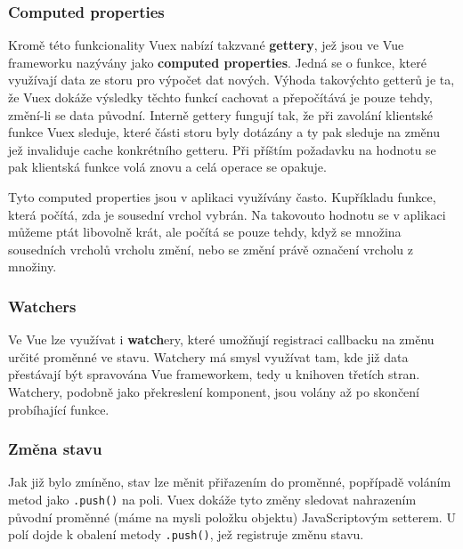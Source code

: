 \subsubsection{Computed properties}

Kromě této funkcionality Vuex nabízí takzvané \textbf{gettery}, jež jsou ve Vue frameworku nazývány jako \textbf{computed properties}. Jedná se o funkce, které využívají data ze storu pro výpočet dat nových. Výhoda takovýchto getterů je ta, že Vuex dokáže výsledky těchto funkcí cachovat a přepočítává je pouze tehdy, změní-li se data původní. Interně gettery fungují tak, že při zavolání klientské funkce Vuex sleduje, které části storu byly dotázány a ty pak sleduje na změnu jež invaliduje cache konkrétního getteru. Při příštím požadavku na hodnotu se pak klientská funkce volá znovu a celá operace se opakuje.

Tyto computed properties jsou v aplikaci využívány často. Kupříkladu funkce, která počítá, zda je sousední vrchol vybrán. Na takovouto hodnotu se v aplikaci můžeme ptát libovolně krát, ale počítá se pouze tehdy, když se množina sousedních vrcholů vrcholu změní, nebo se změní právě označení vrcholu z množiny.

\subsubsection{Watchers}

Ve Vue lze využívat i \textbf{watch}ery, které umožňují registraci callbacku na změnu určité proměnné ve stavu. Watchery má smysl využívat tam, kde již data přestávají být spravována Vue frameworkem, tedy u knihoven třetích stran. Watchery, podobně jako překreslení komponent, jsou volány až po skončení probíhající funkce.

\subsubsection{Změna stavu}

Jak již bylo zmíněno, stav lze měnit přiřazením do proměnné, popřípadě voláním metod jako \texttt{.push()} na poli. Vuex dokáže tyto změny sledovat nahrazením původní proměnné (máme na mysli položku objektu) JavaScriptovým setterem. U polí dojde k obalení metody \texttt{.push()}, jež registruje změnu stavu.

